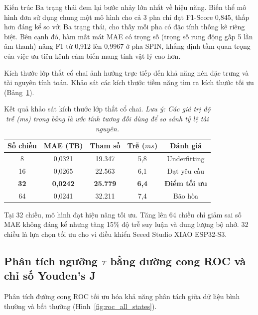 Kiến trúc Ba trạng thái đem lại bước nhảy lớn nhất về hiệu năng. Biến thể mô hình đơn sử dụng chung một mô hình cho cả 3 pha chỉ đạt F1-Score 0,845, thấp hơn đáng kể so với Ba trạng thái, cho thấy mỗi pha có đặc tính thống kê riêng biệt. Bên cạnh đó, hàm mất mát MAE có trọng số (trọng số rung động gấp 5 lần âm thanh) nâng F1 từ 0,912 lên 0,9967 ở pha SPIN, khẳng định tầm quan trọng của việc ưu tiên kênh cảm biến mang tính vật lý cao hơn.

Kích thước lớp thắt cổ chai ảnh hưởng trực tiếp đến khả năng nén đặc trưng và tài nguyên tính toán. Khảo sát các kích thước tiềm năng tìm ra kích thước tối ưu (Bảng~\ref{tab:bottleneck_sweep}).

\begin{table}[H]
\centering
\caption[Kết quả khảo sát lớp thắt cổ chai]{Kết quả khảo sát kích thước lớp thắt cổ chai. \textit{Lưu ý: Các giá trị độ trễ (ms) trong bảng là ước tính tương đối dùng để so sánh tỷ lệ tài nguyên.}}
\label{tab:bottleneck_sweep}
\begin{tabular}{|c|c|c|c|c|}
\hline
\textbf{Số chiều} & \textbf{MAE (TB)} & \textbf{Tham số} & \textbf{Trễ ($ms$)} & \textbf{Đánh giá} \\ \hline
8 & 0,0321 & 19.347 & 5,8 & Underfitting \\ \hline
16 & 0,0265 & 22.563 & 6,1 & Đạt yêu cầu \\ \hline
\textbf{32} & \textbf{0,0242} & \textbf{25.779} & \textbf{6,4} & \textbf{Điểm tối ưu} \\ \hline
64 & 0,0241 & 32.211 & 7,4 & Bão hòa \\ \hline
\end{tabular}
\end{table}

Tại 32 chiều, mô hình đạt hiệu năng tối ưu. Tăng lên 64 chiều chỉ giảm sai số MAE không đáng kể nhưng tăng 15\% độ trễ suy luận và dung lượng bộ nhớ. 32 chiều là lựa chọn tối ưu cho vi điều khiển Seeed Studio XIAO ESP32-S3.

\subsection{Phân tích ngưỡng $\tau$ bằng đường cong ROC và chỉ số Youden's J}
Phân tích đường cong ROC tối ưu hóa khả năng phân tách giữa dữ liệu bình thường và bất thường (Hình~\ref{fig:roc_all_states}).

